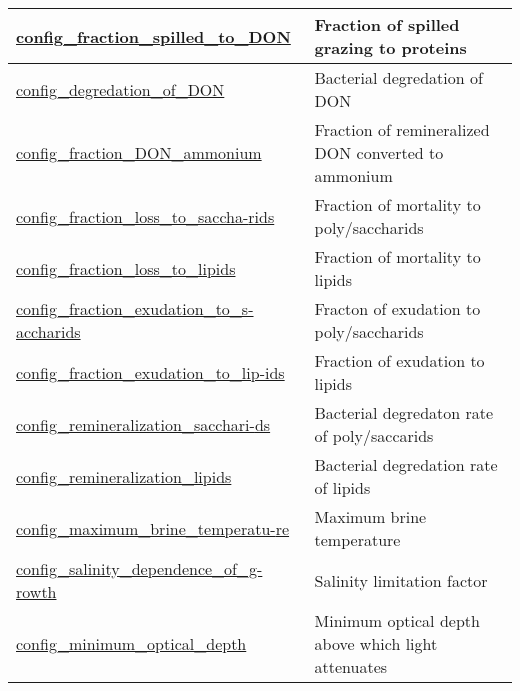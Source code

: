 {\begin{center}
\begin{longtable}{| p{2.0in} || p{4.0in} |}
    \hline
    \hyperref[subsec:nm_sec_config_fraction_spilled_to_DON]{config\_fraction\_spilled\_to\_DON} & Fraction of spilled grazing to proteins \\
    \hline
    \hyperref[subsec:nm_sec_config_degredation_of_DON]{config\_degredation\_of\_DON} & Bacterial degredation of DON \\
    \hline
    \hyperref[subsec:nm_sec_config_fraction_DON_ammonium]{config\_fraction\_DON\_ammonium} & Fraction of remineralized DON converted to ammonium \\
    \hline
    \hyperref[subsec:nm_sec_config_fraction_loss_to_saccharids]{config\_fraction\_loss\_to\_saccha-}\hyperref[subsec:nm_sec_config_fraction_loss_to_saccharids]{rids}& Fraction of mortality to poly/saccharids \\
    \hline
    \hyperref[subsec:nm_sec_config_fraction_loss_to_lipids]{config\_fraction\_loss\_to\_lipids} & Fraction of mortality to lipids \\
    \hline
    \hyperref[subsec:nm_sec_config_fraction_exudation_to_saccharids]{config\_fraction\_exudation\_to\_s-}\hyperref[subsec:nm_sec_config_fraction_exudation_to_saccharids]{accharids}& Fracton of exudation to poly/saccharids \\
    \hline
    \hyperref[subsec:nm_sec_config_fraction_exudation_to_lipids]{config\_fraction\_exudation\_to\_lip-}\hyperref[subsec:nm_sec_config_fraction_exudation_to_lipids]{ids}& Fraction of exudation to lipids \\
    \hline
    \hyperref[subsec:nm_sec_config_remineralization_saccharids]{config\_remineralization\_sacchari-}\hyperref[subsec:nm_sec_config_remineralization_saccharids]{ds}& Bacterial degredaton rate of poly/saccarids \\
    \hline
    \hyperref[subsec:nm_sec_config_remineralization_lipids]{config\_remineralization\_lipids} & Bacterial degredation rate of lipids \\
    \hline
    \hyperref[subsec:nm_sec_config_maximum_brine_temperature]{config\_maximum\_brine\_temperatu-}\hyperref[subsec:nm_sec_config_maximum_brine_temperature]{re}& Maximum brine temperature \\
    \hline
    \hyperref[subsec:nm_sec_config_salinity_dependence_of_growth]{config\_salinity\_dependence\_of\_g-}\hyperref[subsec:nm_sec_config_salinity_dependence_of_growth]{rowth}& Salinity limitation factor \\
    \hline
    \hyperref[subsec:nm_sec_config_minimum_optical_depth]{config\_minimum\_optical\_depth} & Minimum optical depth above which light attenuates \\

\end{longtable}
\end{center}}
